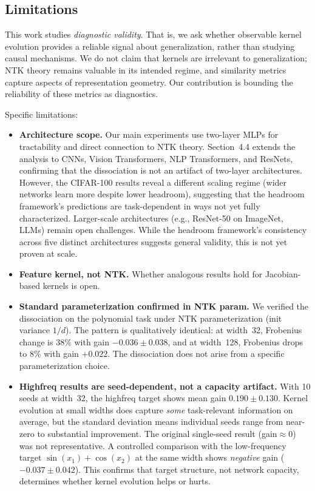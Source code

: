 \documentclass[10pt]{article}
\begin{document}
\subsection{Limitations}
This work studies \emph{diagnostic validity}. That is, we ask whether observable kernel evolution provides a reliable signal about generalization, rather than studying causal mechanisms.  We do not claim that kernels are irrelevant to generalization; NTK theory remains valuable in its intended regime, and similarity metrics capture aspects of representation geometry.  Our contribution is bounding the reliability of these metrics as diagnostics.

Specific limitations:
\begin{itemize}
    \item \textbf{Architecture scope.}  Our main experiments use two-layer MLPs for tractability and direct connection to NTK theory.  Section~4.4 extends the analysis to CNNs, Vision Transformers, NLP Transformers, and ResNets, confirming that the dissociation is not an artifact of two-layer architectures.  However, the CIFAR-100 results reveal a different scaling regime (wider networks learn more despite lower headroom), suggesting that the headroom framework's predictions are task-dependent in ways not yet fully characterized.  Larger-scale architectures (e.g., ResNet-50 on ImageNet, LLMs) remain open challenges.  While the headroom framework's consistency across five distinct architectures suggests general validity, this is not yet proven at scale.
    \item \textbf{Feature kernel, not NTK.}  Whether analogous results hold for Jacobian-based kernels is open.
    \item \textbf{Standard parameterization confirmed in NTK param.}  We verified the dissociation on the polynomial task under NTK parameterization (init variance $1/d$). The pattern is qualitatively identical: at width~32, Frobenius change is $38\%$ with gain $-0.036\pm0.038$, and at width~128, Frobenius drops to $8\%$ with gain $+0.022$. The dissociation does not arise from a specific parameterization choice.
    \item \textbf{Highfreq results are seed-dependent, not a capacity artifact.}  With 10 seeds at width~32, the highfreq target shows mean gain $0.190\pm0.130$. Kernel evolution at small widths does capture \emph{some} task-relevant information on average, but the standard deviation means individual seeds range from near-zero to substantial improvement.  The original single-seed result (gain$\approx0$) was not representative.  A controlled comparison with the low-frequency target $\sin(x_1)+\cos(x_2)$ at the same width shows \emph{negative} gain ($-0.037\pm0.042$). This confirms that target structure, not network capacity, determines whether kernel evolution helps or hurts.

\end{itemize}
\end{document}
